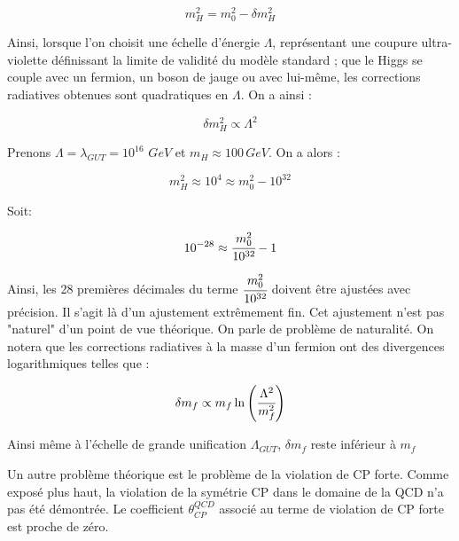   \begin{equation}
   m_H^2 = m_0^2 - \delta m_H^2
  \end{equation}

  Ainsi, lorsque l'on choisit une \'echelle d'\'energie $\Lambda$, repr\'esentant une coupure ultra-violette d\'efinissant la limite de validit\'e du mod\`ele standard ; que le Higgs se couple avec un fermion, un boson de jauge ou avec lui-m\^eme, les corrections radiatives obtenues sont quadratiques en $\Lambda$. On a ainsi :
  
  \begin{equation}
   \delta m_H^2 \propto \Lambda^2
  \end{equation}

  Prenons $\Lambda = \lambda_{GUT} = 10^{16}$ $GeV$ et $m_H \approx 100 \, GeV$. On a alors : 
  
  \begin{equation}
   m_H^2 \approx 10^4 \approx m_0^2 - 10^{32}
  \end{equation}

  Soit: 
  
  \begin{equation}
  10^{-28} \approx \cfrac{m_0^2}{10^{32}} - 1
  \end{equation}

  Ainsi, les 28 premi\`eres d\'ecimales du terme $\cfrac{m_0^2}{10^{32}}$ doivent \^etre ajust\'ees avec pr\'ecision. Il s'agit l\`a d'un ajustement extrêmement fin. Cet ajustement n'est pas "naturel" d'un point de vue th\'eorique. On parle de probl\`eme de naturalit\'e.  On notera que les corrections radiatives \`a la masse d'un fermion ont des divergences logarithmiques telles que : 
  
  \begin{equation}
   \delta m_f \propto m_f \ln \left(\cfrac{\Lambda^2}{m_f^2}\right)
  \end{equation}
  
  Ainsi m\^eme \`a l'\'echelle de grande unification $\Lambda_{GUT}$, $\delta m_f$ reste inf\'erieur \`a $m_f$
  
  \medskip
  
  Un autre probl\`eme th\'eorique est le probl\`eme de la violation de CP forte. Comme expos\'e plus haut, la violation de la sym\'etrie CP dans le domaine de la QCD n'a pas \'et\'e d\'emontr\'ee. Le coefficient $\theta^{QCD}_{CP}$ associ\'e au terme de violation de CP forte est proche de z\'ero.

  \medskip
  
